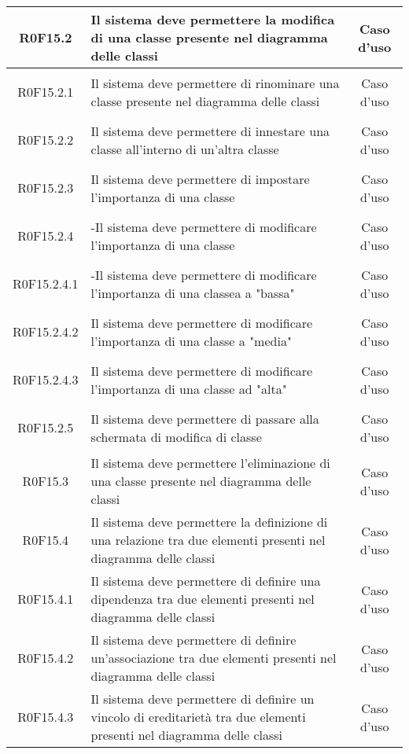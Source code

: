 \documentclass[../AnalisiDeiRequisiti.tex]{subfiles}
\begin{document}
\begin{longtable}{|c|>{\centering}p{7cm}|c|}
	\hypertarget{R0F15.2}{R0F15.2} & Il sistema deve permettere la modifica di una classe presente nel diagramma delle classi & Caso d'uso \\ \hline
	\hypertarget{R0F15.2.1}{R0F15.2.1} & Il sistema deve permettere di rinominare una classe presente nel diagramma delle classi & Caso d'uso \\ \hline
	\hypertarget{R0F15.2.2}{R0F15.2.2} & Il sistema deve permettere di innestare una classe all'interno di un'altra classe & Caso d'uso \\ \hline
	\hypertarget{R0F15.2.3}{R0F15.2.3} & Il sistema deve permettere di impostare l'importanza di una classe & Caso d'uso \\ \hline
	\hypertarget{R0F15.2.4}{R0F15.2.4} & -Il sistema deve permettere di modificare l'importanza di una classe & Caso d'uso \\ \hline
	\hypertarget{R0F15.2.4.1}{R0F15.2.4.1} & -Il sistema deve permettere di modificare l'importanza di una classea a "bassa" & Caso d'uso \\ \hline
	\hypertarget{R0F15.2.4.2}{R0F15.2.4.2} & Il sistema deve permettere di modificare l'importanza di una classe a "media" & Caso d'uso \\ \hline
	\hypertarget{R0F15.2.4.3}{R0F15.2.4.3} & Il sistema deve permettere di modificare l'importanza di una classe ad "alta" & Caso d'uso \\ \hline
	\hypertarget{R0F15.2.5}{R0F15.2.5} & Il sistema deve permettere di passare alla schermata di modifica di classe & Caso d'uso \\ \hline
	\hypertarget{R0F15.3}{R0F15.3} & Il sistema deve permettere l'eliminazione di una classe presente nel diagramma delle classi & Caso d'uso \\ \hline
	\hypertarget{R0F15.4}{R0F15.4} & Il sistema deve permettere la definizione di una relazione tra due elementi presenti nel diagramma delle classi & Caso d'uso \\ \hline
	\hypertarget{R0F15.4.1}{R0F15.4.1} & Il sistema deve permettere di definire una dipendenza tra due elementi presenti nel diagramma delle classi & Caso d'uso \\ \hline
	\hypertarget{R0F15.4.2}{R0F15.4.2} & Il sistema deve permettere di definire un'associazione tra due elementi presenti nel diagramma delle classi & Caso d'uso \\ \hline
	\hypertarget{R0F15.4.3}{R0F15.4.3} & Il sistema deve permettere di definire un vincolo di ereditarietà tra due elementi presenti nel diagramma delle classi & Caso d'uso \\ \hline

\end{longtable}
\end{document}
